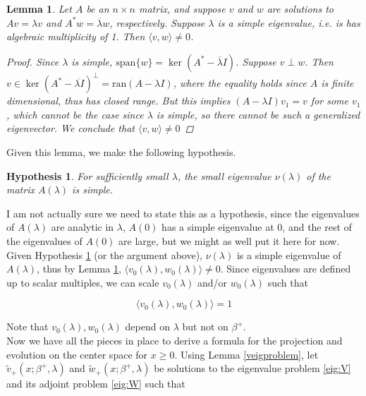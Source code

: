 \documentclass[12pt]{article}
\newtheorem{lemma}{Lemma}
\newtheorem{hypothesis}{Hypothesis}
\begin{document}
\begin{lemma}\label{perpeigs}
Let $A$ be an $n \times n$ matrix, and suppose $v$ and $w$ are solutions to $Av = \lambda v$ and $A^*w = \overline{\lambda}w$, respectively. Suppose $\lambda$ is a simple eigenvalue, i.e. is has algebraic multiplicity of 1. Then $\langle v, w \rangle \neq 0$.
\begin{proof}
Since $\lambda$ is simple, $\text{span} \{w\} = \ker(A^* - \overline{\lambda}I)$. Suppose $v \perp w$. Then $v \in \ker(A^* - \overline{\lambda I})^\perp = \text{ran}(A - \lambda I)$, where the equality holds since $A$ is finite dimensional, thus has closed range. But this implies $(A - \lambda I)v_1 = v$ for some $v_1$, which cannot be the case since $\lambda$ is simple, so there cannot be such a generalized eigenvector. We conclude that $\langle v, w \rangle \neq 0$
\end{proof}
\end{lemma}

Given this lemma, we make the following hypothesis.

\begin{hypothesis}\label{simplesmalleig}
For sufficiently small $\lambda$, the small eigenvalue $\nu(\lambda)$ of the matrix $A(\lambda)$ is simple.
\end{hypothesis}

I am not actually sure we need to state this as a hypothesis, since the eigenvalues of $A(\lambda)$ are analytic in $\lambda$, $A(0)$ has a simple eigenvalue at 0, and the rest of the eigenvalues of $A(0)$ are large, but we might as well put it here for now.\\

Given Hypothesis \ref{simplesmalleig} (or the argument above), $\nu(\lambda)$ is a simple eigenvalue of $A(\lambda)$, thus by Lemma \ref{perpeigs}, $\langle v_0(\lambda), w_0(\lambda) \rangle \neq 0$. Since eigenvalues are defined up to scalar multiples, we can scale $v_0(\lambda)$ and/or $w_0(\lambda)$ such that

\[
\langle v_0(\lambda), w_0(\lambda) \rangle = 1
\]

Note that $v_0(\lambda), w_0(\lambda)$ depend on $\lambda$ but not on $\beta^+$.\\
 
Now we have all the pieces in place to derive a formula for the projection and evolution on the center space for $x \geq 0$. Using Lemma \ref{veigproblem}, let $\tilde{v}_+(x; \beta^+, \lambda)$ and $\tilde{w}_+(x; \beta^+, \lambda)$ be solutions to the eigenvalue problem \eqref{eig:V} and its adjoint problem \eqref{eig:W} such that
\end{document}
